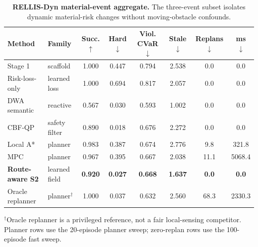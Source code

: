 \begin{table}[t]
\centering
\small
\caption{\textbf{RELLIS-Dyn material-event aggregate.} The three-event subset isolates dynamic material-risk changes without moving-obstacle confounds.}
\label{tab:rellis_dyn_material_aggregate}
\begin{tabular}{llcccccc}
\toprule
Method & Family & Succ. $\uparrow$ & Hard $\downarrow$ & Viol. CVaR $\downarrow$ & Stale $\downarrow$ & Replans $\downarrow$ & ms $\downarrow$ \\
\midrule
Stage 1 & scaffold & 1.000 & 0.447 & 0.794 & 2.538 & 0.0 & 0.0 \\
Risk-loss-only & learned loss & 1.000 & 0.694 & 0.817 & 2.057 & 0.0 & 0.0 \\
\midrule
DWA semantic & reactive & 0.567 & 0.030 & 0.593 & 1.002 & 0.0 & 0.0 \\
CBF-QP & safety filter & 0.890 & 0.018 & 0.676 & 2.272 & 0.0 & 0.0 \\
\midrule
Local A* & planner & 0.983 & 0.387 & 0.674 & 2.776 & 9.8 & 321.8 \\
MPC & planner & 0.967 & 0.395 & 0.667 & 2.038 & 11.1 & 5068.4 \\
\midrule
\textbf{Route-aware S2} & learned field & \textbf{0.920} & \textbf{0.027} & \textbf{0.668} & \textbf{1.637} & \textbf{0.0} & \textbf{0.0} \\
\midrule
Oracle replanner & planner$^\dagger$ & 1.000 & 0.037 & 0.632 & 2.560 & 68.3 & 2330.3 \\
\bottomrule
\end{tabular}
\vspace{0.35em}\footnotesize $^\dagger$Oracle replanner is a privileged reference, not a fair local-sensing competitor. Planner rows use the 20-episode planner sweep; zero-replan rows use the 100-episode fast sweep.
\end{table}
